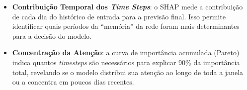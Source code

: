 \begin{itemize}
    \item \textbf{Contribuição Temporal dos \textit{Time Steps}}: o SHAP mede a contribuição de cada dia do histórico de entrada para a previsão final. Isso permite identificar quais períodos da ``memória'' da rede foram mais determinantes para a decisão do modelo.
    \item \textbf{Concentração da Atenção}: a curva de importância acumulada (Pareto) indica quantos \textit{timesteps} são necessários para explicar 90\% da importância total, revelando se o modelo distribui sua atenção ao longo de toda a janela ou a concentra em poucos dias recentes.
\end{itemize}
